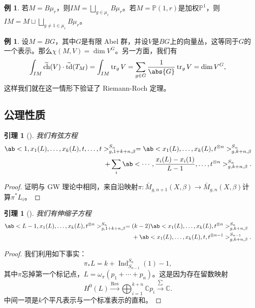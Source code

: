 \documentclass{amsart}
\newtheorem{lem}[thm]{引理}
\theoremstyle{definition}
\newtheorem{exm}[thm]{例}
\theoremstyle{remark}
\theoremstyle{plain}
\theoremstyle{definition}
\theoremstyle{remark}
\newcommand{\C}{\mathbb{C}}
\renewcommand{\P}{\mathbb{P}}
\newcommand{\on}[1]{\operatorname{#1}}
\newcommand{\wt}[1]{\widetilde{#1}}
\newcommand{\1}{\mathbf{1}}
\newcommand{\2}{\mathbf{2}}
\newcommand{\3}{\mathbf{3}}
\begin{document}
\begin{exm}
    若\(M = B\mu_r\)，则\(IM = \bigsqcup_{g \in \mu_r} B \mu_r\)。若\(M = \P(1, r)\)是加权\(\P^1\)，则\(IM = M \sqcup \bigsqcup_{g \neq 1 \in \mu_r} B\mu_r\)。
\end{exm}

\begin{exm}
    设\(M = BG\)，其中\(G\)是有限 Abel 群，并设\(V\)是\(BG\)上的向量丛，这等同于\(G\)的一个表示。那么\(\chi(M, V) = \dim V^G\)。另一方面，我们有
    \[ \int_{IM} \wt{\on{ch}}(V) \cdot \wt{\on{td}}(T_M) = \int_{IM} \on{tr}_g V = \sum_{g \in G} \frac{1}{\abs{G}} \on{tr}_g V = \dim V^G, \]
    这样我们就在这一情形下验证了 Riemann-Roch 定理。
\end{exm}

\subsection{公理性质}%
\label{sub:Axiomatic properties}

\begin{lem}[{\cite{GiventalK7}}]
    我们有\textit{弦方程}
    \begin{align*}
        \ab< 1, x_1(L), \ldots, x_k(L), t, \ldots, t >_{g, 1+k+n, \beta}^{S_n} = \ab<x_1(L), \ldots, x_k(L), t^{\otimes n}>^{S_n}_{g,k+n,\beta} \\
        + \sum_i \ab< \cdots, \frac{x_i(L) - x_i(1)}{L-1}, \ldots, t^{\otimes n}>^{S_n}_{g,k+n,\beta}. 
    \end{align*}
\end{lem}

\begin{proof}
    证明与 GW 理论中相同，来自沿映射\(\pi \colon\bar{M}_{g,n+1}(X,\beta) \to \bar{M}_{g,n}(X,\beta)\)计算\(\pi^* L_i\)。
\end{proof}

\begin{lem}[{\cite{GiventalK7}}]
    我们有\textit{伸缩子方程}
    \begin{align*}
        \ab<L-1, x_1(L), \ldots, x_k(L), t^{\otimes n}>_{g,1+k+n,\beta}^{S_n} ={}& (k-2)\ab<x_1(L), \ldots, x_k(L), t^{\otimes n}>_{g,k+n,\beta}^{S_n} \\
        &+ \ab<x_1(L), \ldots, x_k(L), t, t^{\otimes n-1}>_{g,k+n,\beta}^{S_{n-1}}.
    \end{align*}
\end{lem}

\begin{proof}
    我们利用如下事实：
    \[ \pi_* L = k + \on{Ind}_{S_{n-1}}^{S_n}(1) - 1, \]
    其中\(\pi\)忘掉第一个标记点，\(L = \omega_{\pi} (p_1 + \cdots + p_n)\)。这是因为存在留数映射
    \[ H^0(L) \xrightarrow{\on{Res}} \bigoplus_{i=1}^{k+n} \C p_i \xrightarrow{\sum} \C. \]
    中间一项是\(k\)个平凡表示与一个标准表示的直和。
\end{proof}
\end{document}
